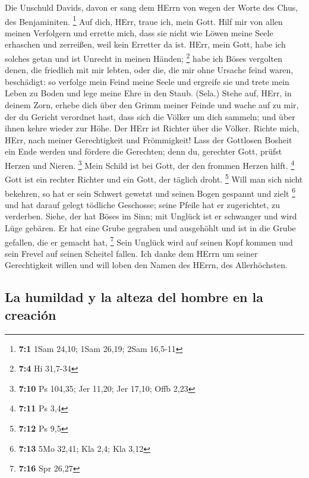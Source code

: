  Die Unschuld Davids, davon er sang dem HErrn von wegen
der Worte des Chus, des Benjaminiten. \footnote{\textbf{7:1} 1Sam 24,10;
  1Sam 26,19; 2Sam 16,5-11}  Auf dich, HErr, traue ich,
mein Gott. Hilf mir von allen meinen Verfolgern und errette mich,
 dass sie nicht wie Löwen meine Seele erhaschen und
zerreißen, weil kein Erretter da ist.  HErr, mein Gott,
habe ich solches getan und ist Unrecht in meinen Händen; \footnote{\textbf{7:4}
  Hi 31,7-34}  habe ich Böses vergolten denen, die
friedlich mit mir lebten, oder die, die mir ohne Ursache feind waren,
beschädigt:  so verfolge mein Feind meine Seele und
ergreife sie und trete mein Leben zu Boden und lege meine Ehre in den
Staub. (Sela.)  Stehe auf, HErr, in deinem Zorn, erhebe
dich über den Grimm meiner Feinde und wache auf zu mir, der du Gericht
verordnet hast,  dass sich die Völker um dich sammeln; und
über ihnen kehre wieder zur Höhe.  Der HErr ist Richter
über die Völker. Richte mich, HErr, nach meiner Gerechtigkeit und
Frömmigkeit!  Lass der Gottlosen Bosheit ein Ende werden
und fördere die Gerechten; denn du, gerechter Gott, prüfst Herzen und
Nieren. \footnote{\textbf{7:10} Ps 104,35; Jer 11,20; Jer 17,10; Offb
  2,23}  Mein Schild ist bei Gott, der den frommen Herzen
hilft. \footnote{\textbf{7:11} Ps 3,4}  Gott ist ein
rechter Richter und ein Gott, der täglich droht. \footnote{\textbf{7:12}
  Ps 9,5}  Will man sich nicht bekehren, so hat er sein
Schwert gewetzt und seinen Bogen gespannt und zielt \footnote{\textbf{7:13}
  5Mo 32,41; Kla 2,4; Kla 3,12}  und hat darauf gelegt
tödliche Geschosse; seine Pfeile hat er zugerichtet, zu verderben.
 Siehe, der hat Böses im Sinn; mit Unglück ist er
schwanger und wird Lüge gebären.  Er hat eine Grube
gegraben und ausgehöhlt und ist in die Grube gefallen, die er gemacht
hat, \footnote{\textbf{7:16} Spr 26,27}  Sein Unglück
wird auf seinen Kopf kommen und sein Frevel auf seinen Scheitel fallen.
 Ich danke dem HErrn um seiner Gerechtigkeit willen und
will loben den Namen des HErrn, des Allerhöchsten.

\hypertarget{la-humildad-y-la-alteza-del-hombre-en-la-creaciuxf3n}{%
\subsection{La humildad y la alteza del hombre en la
creación}\label{la-humildad-y-la-alteza-del-hombre-en-la-creaciuxf3n}}

